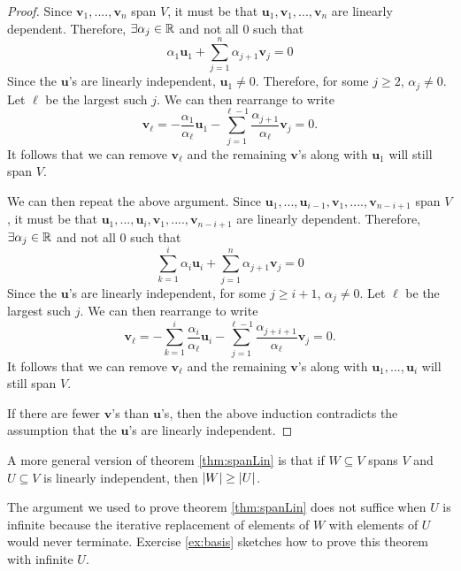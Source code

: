 \begin{proof}
  Since $\mathbf{v}_1, ...., \mathbf{v}_n$ span $V$, it must be that 
  $\mathbf{u}_1, \mathbf{v}_1, ... , \mathbf{v}_n$ are linearly
  dependent. Therefore, $\exists \alpha_j \in \mathbb{R}$ and not all $0$ such that 
  \[ \alpha_1 \mathbf{u}_1 + \sum_{j=1}^n \alpha_{j+1} \mathbf{v}_j =
  0 \]
  Since the $\mathbf{u}$'s are linearly independent, $\mathbf{u}_1
  \neq 0$. Therefore, for some $j \geq 2$, $\alpha_j \neq 0$. Let
  $\ell$ be the largest such $j$. We can then rearrange to write
  \[ \mathbf{v}_\ell = -\frac{\alpha_1}{\alpha_\ell} \mathbf{u}_1 -
  \sum_{j=1}^{\ell-1} \frac{\alpha_{j+1}}{\alpha_\ell} \mathbf{v}_j = 0. \]
  It follows that we can remove $\mathbf{v}_\ell$ and the remaining
  $\mathbf{v}$'s along with $\mathbf{u}_1$ will still span $V$. 

  We can then repeat the above argument.  Since $\mathbf{u}_1, ...,
  \mathbf{u}_{i-1}, \mathbf{v}_1, ...., \mathbf{v}_{n-i+1}$ span $V$,
  it must be that $\mathbf{u}_1, ...,
  \mathbf{u}_{i}, \mathbf{v}_1, ...., \mathbf{v}_{n-i+1}$ are
  linearly dependent. Therefore, $\exists \alpha_j \in \mathbb{R}$ and not all
  $0$ such that
  \[ \sum_{k=1}^i \alpha_i \mathbf{u}_i + \sum_{j=1}^n \alpha_{j+1}
  \mathbf{v}_j = 0 \] 
  Since the $\mathbf{u}$'s are linearly
  independent, for some $j \geq i+1$, $\alpha_j \neq 0$. Let $\ell$ be
  the largest such $j$. We can then rearrange to write
  \[ \mathbf{v}_\ell = -\sum_{k=1}^i \frac{\alpha_i}{\alpha_\ell} \mathbf{u}_i -
  \sum_{j=1}^{\ell-1} \frac{\alpha_{j+i+1}}{\alpha_\ell} \mathbf{v}_j = 0. \]
  It follows that we can remove $\mathbf{v}_\ell$ and the remaining
  $\mathbf{v}$'s along with $\mathbf{u}_1, ... , \mathbf{u}_i$ will
  still span $V$. 

  If there are fewer $\mathbf{v}$'s than $\mathbf{u}$'s, then the
  above induction contradicts the assumption that the $\mathbf{u}$'s
  are linearly independent.
\end{proof}
\begin{remark}
  A more general version of theorem \ref{thm:spanLin} is that if $W
  \subseteq V$ spans $V$ and $U \subseteq V$ is linearly independent,
  then $\left\vert {W} \right\vert \geq \left\vert {U} \right\vert$. 

  The argument we used to prove theorem \ref{thm:spanLin} does not
  suffice when $U$ is infinite because the iterative replacement of
  elements of $W$ with elements of $U$ would never terminate. Exercise
  \ref{ex:basis} sketches how to prove this theorem with infinite
  $U$. 
\end{remark}
